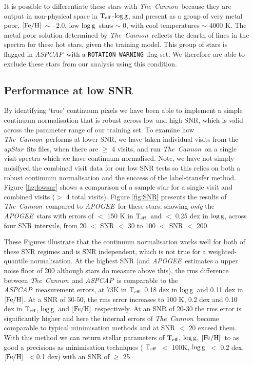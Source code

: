 \documentclass[12pt, preprint]{aastex}
\newcommand{\teff}{\mbox{$\rm T_{eff}$}}
\newcommand{\feh}{\mbox{$\rm [Fe/H]$}}
\newcommand{\logg}{\mbox{$\rm \log g$}}
\newcommand{\tc}{\textsl{The~Cannon}}
\newcommand{\apogee}{\textsl{APOGEE}}
\newcommand{\aspcap}{\textsl{ASPCAP}}
\newcommand{\rotwarn}{\texttt{ROTATION WARNING}}
\newcommand{\apstar}{\textsl{apStar}}
\begin{document}
It is possible to differentiate these stars with \tc\ because they are output in non-physical space in \teff-\logg, and present as a group of very metal poor, \feh\ $\sim$ --2.0, low \logg\ stars $\sim$ 0, with cool temperatures $\sim$ 4000 K. The metal poor solution determined by \tc\ reflects the dearth of lines in the spectra for these hot stars, given the training model. This group of stars is flagged in \aspcap\ with a \rotwarn\ flag set. We therefore are able to exclude these stars from our analysis using this condition. 
 



 \subsection{Performance at low SNR}


By identifying `true' continuum pixels we have been able to implement a simple continuum normalisation that is robust across low and high SNR, which is valid across the parameter range of our training set. To examine how \tc\ performs at lower SNR, we have taken individual visits from the \apstar\ fits files, when there are $\ge$ 4 visits, and run \tc\ on a single visit spectra which we have continuum-normalised. Note, we have not simply noisifyed the combined visit data for our low SNR tests so this relies on both a robust continuum normalisation and the success of the label-transfer method. Figure \ref{fig:lowsnr} shows a comparison of a sample star for a single visit and combined visits ($>$ 4 total visits). Figure \ref{fig:SNR} presents the results of \tc\ compared to \apogee\ for these stars, showing \textit{only} the \apogee\ stars with errors of $<$ 150 K in \teff\ and $<$ 0.25 dex in \logg, across four SNR intervals, from 20 $<$ SNR $<$ 30 to 100 $<$ SNR $<$ 200. 



These Figures illustrate that the continuum normalisation works well for both of these SNR regimes and is SNR independent, which is not true for a weighted-quantile normalisation. At the highest SNR (and \apogee\ estimates a upper noise floor of 200 although stars do measure above this), the rms difference between \tc\ and \aspcap\ is comparable to the \aspcap\ measurement errors, at 73K in \teff\, 0.18 dex in \logg\ and 0.11 dex in \feh.  At a SNR of 30-50, the rms error increases to 100 K, 0.2 dex and 0.10 dex in \teff, \logg\ and \feh\, respectively. At an SNR of 20-30 the rms error is significantly higher and here the internal errors of \tc\ become comparable to typical minimisation methods and at SNR $<$ 20 exceed them. With this method we can return stellar parameters of \teff, \logg, \feh\ to as good a precisions as minimisation techniques ( \teff\ $<$ 100K, \logg\ $<$ 0.2 dex, \feh\ $< $0.1 dex) with an SNR of $\ge$ 25. 
 
\end{document}
